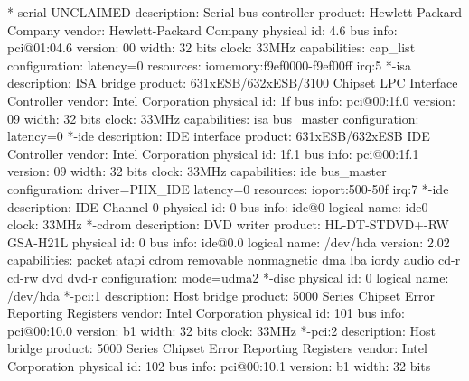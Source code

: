 \documentclass[mingoth,a4paper]{jsarticle}
\begin{document}
\begin{commandline}
           *-serial UNCLAIMED
                description: Serial bus controller
                product: Hewlett-Packard Company
                vendor: Hewlett-Packard Company
                physical id: 4.6
                bus info: pci@01:04.6
                version: 00
                width: 32 bits
                clock: 33MHz
                capabilities: cap_list
                configuration: latency=0
                resources: iomemory:f9ef0000-f9ef00ff irq:5
        *-isa
             description: ISA bridge
             product: 631xESB/632xESB/3100 Chipset LPC Interface Controller
             vendor: Intel Corporation
             physical id: 1f
             bus info: pci@00:1f.0
             version: 09
             width: 32 bits
             clock: 33MHz
             capabilities: isa bus_master
             configuration: latency=0
        *-ide
             description: IDE interface
             product: 631xESB/632xESB IDE Controller
             vendor: Intel Corporation
             physical id: 1f.1
             bus info: pci@00:1f.1
             version: 09
             width: 32 bits
             clock: 33MHz
             capabilities: ide bus_master
             configuration: driver=PIIX_IDE latency=0
             resources: ioport:500-50f irq:7
           *-ide
                description: IDE Channel 0
                physical id: 0
                bus info: ide@0
                logical name: ide0
                clock: 33MHz
              *-cdrom
                   description: DVD writer
                   product: HL-DT-STDVD+-RW GSA-H21L
                   physical id: 0
                   bus info: ide@0.0
                   logical name: /dev/hda
                   version: 2.02
                   capabilities: packet atapi cdrom removable nonmagnetic dma lba iordy audio cd-r cd-rw dvd dvd-r
                   configuration: mode=udma2
                 *-disc
                      physical id: 0
                      logical name: /dev/hda
     *-pci:1
          description: Host bridge
          product: 5000 Series Chipset Error Reporting Registers
          vendor: Intel Corporation
          physical id: 101
          bus info: pci@00:10.0
          version: b1
          width: 32 bits
          clock: 33MHz
     *-pci:2
          description: Host bridge
          product: 5000 Series Chipset Error Reporting Registers
          vendor: Intel Corporation
          physical id: 102
          bus info: pci@00:10.1
          version: b1
          width: 32 bits

\end{commandline}
\end{document}
